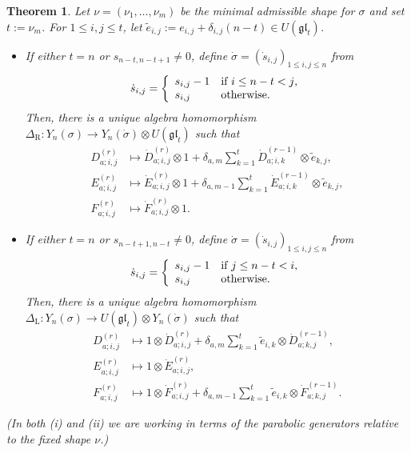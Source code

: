 \documentclass[twoside,12pt,reqno]{amsart}
\newtheorem{Theorem}[Proposition]{Theorem}
\def\rt{{\operatorname{\scriptscriptstyle R}}}
\def\lt{{\operatorname{\scriptscriptstyle L}}}
\begin{document}
\begin{Theorem}\label{baby}
Let $\nu = (\nu_1,\dots,\nu_m)$ be the minimal admissible shape for $\sigma$
and set $t := \nu_m$.
For $1 \leq i,j \leq t$, let $\tilde e_{i,j} := e_{i,j} + \delta_{i,j}(n-t)
\in U(\mathfrak{gl}_t)$.
\begin{itemize}
\item[(i)] If either 
$t = n$ or $s_{n-t,n-t+1} \neq 0$, define
$\dot\sigma = (\dot s_{i,j})_{1 \leq i,j \leq n}$ 
from 
\begin{equation}\label{sr}
\dot s_{i,j} = \left\{
\begin{array}{ll}
s_{i,j}-1&\hbox{if $i \leq n-t < j$,}\\
s_{i,j}&\hbox{otherwise.}
\end{array}\right.
\end{equation}
Then, there is a unique algebra homomorphism
$\Delta_{\rt}:Y_n(\sigma) \rightarrow 
Y_n(\dot\sigma) 
\otimes U(\mathfrak{gl}_t)$
such that
\begin{align*}
D_{a;i,j}^{(r)} &\mapsto \dot D_{a;i,j}^{(r)} \otimes 1
+ \delta_{a,m} \sum_{k=1}^{t}\dot D_{a;i,k}^{(r-1)} \otimes \tilde e_{k,j},\\
E_{a;i,j}^{(r)} &\mapsto \dot E_{a;i,j}^{(r)} \otimes 1
+ \delta_{a,m-1} \sum_{k=1}^{t}\dot E_{a;i,k}^{(r-1)} \otimes \tilde e_{k,j},\\
F_{a;i,j}^{(r)} & \mapsto \dot F_{a;i,j}^{(r)} \otimes 1.
\end{align*}
\item[(ii)]
If either $t = n$ or $s_{n-t+1,n-t} \neq 0$, define
$\dot\sigma = (\dot s_{i,j})_{1 \leq i,j \leq n}$ 
from 
\begin{equation}\label{sl}
\dot s_{i,j} = \left\{
\begin{array}{ll}
s_{i,j}-1&\hbox{if $j \leq n-t < i$,}\\
s_{i,j}&\hbox{otherwise.}
\end{array}\right.
\end{equation}
Then, there is a unique algebra homomorphism
$\Delta_{\lt}:Y_n(\sigma) \rightarrow U(\mathfrak{gl}_t) \otimes Y_n(\dot \sigma)$
such that
\begin{align*}
D_{a;i,j}^{(r)} &\mapsto 1 \otimes \dot D_{a;i,j}^{(r)}
+ \delta_{a,m} \sum_{k=1}^{t} \tilde e_{i,k} \otimes \dot D_{a;k,j}^{(r-1)},\\
E_{a;i,j}^{(r)} &\mapsto 1 \otimes \dot E_{a;i,j}^{(r)},\\
F_{a;i,j}^{(r)} & \mapsto 1 \otimes \dot F_{a;i,j}^{(r)}
+ \delta_{a,m-1} \sum_{k=1}^{t}\tilde e_{i,k}\otimes \dot F_{a;k,j}^{(r-1)}.
\end{align*}
\end{itemize}
(In both (i) and (ii) we are working in terms of the parabolic generators
relative to the fixed shape $\nu$.)
\end{Theorem}
\end{document}
